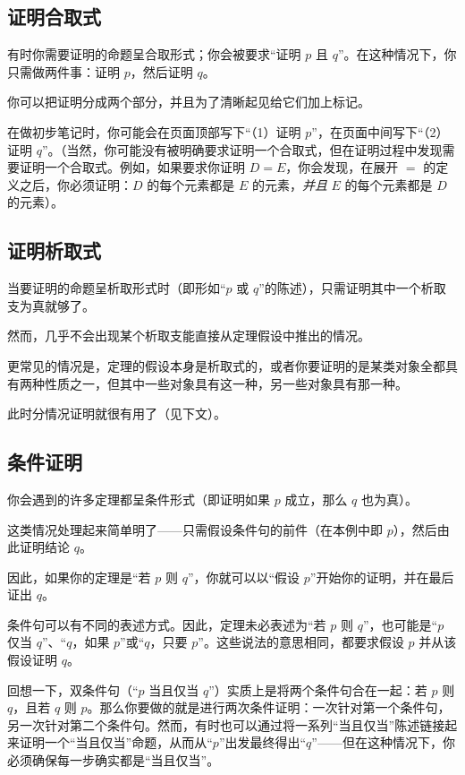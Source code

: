\documentclass[../../../include/open-logic-section]{subfiles}
\begin{document}
\subsection{证明合取式}

有时你需要证明的命题呈合取形式；你会被要求“证明 $p$ 且 $q$”。在这种情况下，你只需做两件事：证明 $p$，然后证明 $q$。

你可以把证明分成两个部分，并且为了清晰起见给它们加上标记。

在做初步笔记时，你可能会在页面顶部写下“（1）证明 $p$”，在页面中间写下“（2）证明 $q$”。（当然，你可能没有被明确要求证明一个合取式，但在证明过程中发现需要证明一个合取式。例如，如果要求你证明 $D = E$，你会发现，在展开 $=$ 的定义之后，你必须证明：$D$ 的每个元素都是 $E$ 的元素，\emph{并且} $E$ 的每个元素都是 $D$ 的元素）。

\subsection{证明析取式}

当要证明的命题呈析取形式时（即形如“$p$ 或 $q$”的陈述），只需证明其中一个析取支为真就够了。

然而，几乎不会出现某个析取支能直接从定理假设中推出的情况。

更常见的情况是，定理的假设本身是析取式的，或者你要证明的是某类对象全都具有两种性质之一，但其中一些对象具有这一种，另一些对象具有那一种。

此时分情况证明就很有用了（见下文）。

\subsection{条件证明}

你会遇到的许多定理都呈条件形式（即证明如果 $p$ 成立，那么 $q$ 也为真）。

这类情况处理起来简单明了——只需假设条件句的前件（在本例中即 $p$），然后由此证明结论 $q$。

因此，如果你的定理是“若 $p$ 则 $q$”，你就可以以“假设 $p$”开始你的证明，并在最后证出 $q$。

条件句可以有不同的表述方式。因此，定理未必表述为“若 $p$ 则 $q$”，也可能是“$p$ 仅当 $q$”、“$q$，如果 $p$”或“$q$，只要 $p$”。这些说法的意思相同，都要求假设 $p$ 并从该假设证明 $q$。

回想一下，双条件句（“$p$ 当且仅当 $q$”）实质上是将两个条件句合在一起：若 $p$ 则 $q$，且若 $q$ 则 $p$。那么你要做的就是进行两次条件证明：一次针对第一个条件句，另一次针对第二个条件句。然而，有时也可以通过将一系列“当且仅当”陈述链接起来证明一个“当且仅当”命题，从而从“$p$”出发最终得出“$q$”——但在这种情况下，你必须确保每一步确实都是“当且仅当”。
\end{document}

